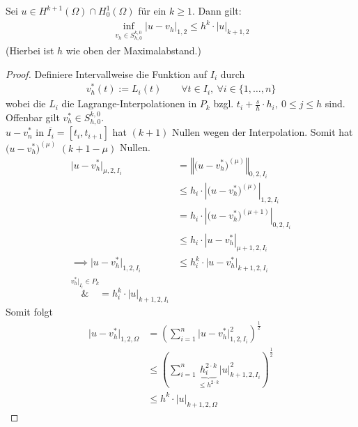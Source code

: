 \begin{theorem}\label{theorem4.2}\enter
Sei $u\in H^{k+1}(\Omega)\cap H^{1}_0(\Omega)$ für ein $k\geq1$. Dann gilt:
\begin{align*}
	\inf\limits_{v_h\in S_{h,0}^{k,0}}\big|u-v_h\big|_{1,2}\leq h^k\cdot|u|_{k+1,2}
\end{align*}
(Hierbei ist $h$ wie oben der Maximalabstand.)
\end{theorem}
\begin{proof}
Definiere Intervallweise die Funktion auf $I_i$ durch
\begin{align*}
v_h^\ast(t):=L_i(t)\qquad\forall t\in I_i,~\forall i\in\lbrace1,\ldots,n\rbrace
\end{align*}
wobei die $L_i$ die Lagrange-Interpolationen in $P_k$ bzgl. $t_i+\frac{s}{h}\cdot h_i,~0\leq j\leq h$ sind.\\
Offenbar gilt $v_h^\ast\in S^{k,0}_{h,0}$. \\
$u-v_n^\ast$ in $\overline{I_i}=[t_i,t_{i+1}]$ hat $(k+1)$ Nullen wegen der Interpolation. Somit hat $\big(u-v_h^\ast)^{(\mu)}$ $(k+1-\mu)$ Nullen.
\begin{align*}
\big|u-v_h^\ast\big|_{\mu,2,I_i}
&=\left\Vert \big(u-v_h^\ast\big)^{(\mu)}\right\Vert_{0,2,I_i}\\
&\stackrel{}{\leq}
h_i\cdot\left|\big(u-v_h^\ast\big)^{(\mu)}\right|_{1,2,I_i}\\
&=h_i\cdot\left|\big(u-v_h^\ast\big)^{(\mu+1)}\right|_{0,2,I_i}\\
&\leq h_i\cdot\left|u-v_h^\ast\right|_{\mu+1,2,I_i}\\
\implies
\big|u-v_h^\ast\big|_{1,2,I_i}
&\leq h_i^k\cdot\big|u-v_h^\ast\big|_{k+1,2,I_i} \\
\overset{v_h^\ast|_{I_i}\in P_k}&=
h_i^k\cdot |u|_{k+1,2,I_i}
\end{align*} 
Somit folgt
\begin{align*}
\big| u-v_h^\ast\big|_{1,2,\Omega}
&=\left(\sum\limits_{i=1}^n\big|u-v_h^\ast\big|^2_{1,2,I_i}\right)^{\frac{1}{2}}\\
&\leq\left(\sum\limits_{i=1}^n \underbrace{h_i^{2\cdot k}}_{\leq h^{2\cdot k}} \big|u\big|^2_{k+1,2,I_i}\right)^{\frac{1}{2}}\\
&\leq h^k\cdot |u|_{k+1,2,\Omega}
\end{align*}
\end{proof}

